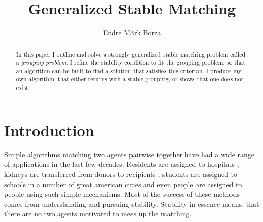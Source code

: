 \documentclass{elsarticle}
\begin{document}

\begin{frontmatter}

\title{Generalized Stable Matching}


\author{Endre Márk Borza}%




\begin{abstract}
In this paper I outline and solve a strongly generalized stable matching problem called a \emph{grouping problem}. I refine the stability condition to fit the grouping problem, so that an algorithm can be built to find a solution that satisfies this criterion. I produce my own algorithm, that either returns with a stable grouping, or shows that one does not exist.
\end{abstract}


\end{frontmatter}







\section{Introduction}


Simple algorithms matching two agents pairwise together have had a wide range of applications in the last few decades. Residents are assigned to hospitals \citep{roth84}, kidneys are transferred from donors to recipients \citep{roth05kid}, students are assigned to schools in a number of great american cities \citep{roth05new,roth05bos} and even people are assigned to people \citep{hitsch10} using such simple mechanisms. Most of the success of these methods comes from understanding and pursuing stability. Stability in essence means, that there are no two agents motivated to mess up the matching.
\end{document}
